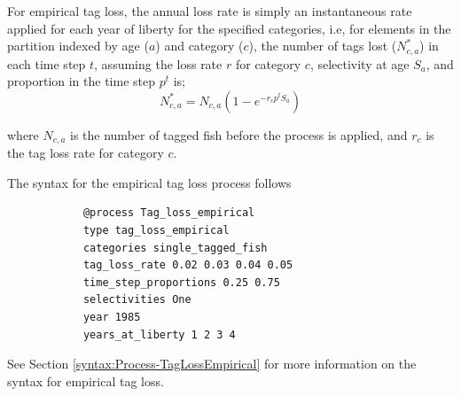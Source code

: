 For empirical tag loss, the annual loss rate is simply an instantaneous rate applied for each year of liberty for the specified categories, i.e, for elements in the partition indexed by age ($a$) and category ($c$), the number of tags lost ($N^*_{c,a}$) in each time step $t$, assuming the loss rate $r$ for category $c$, selectivity at age $S_a$, and proportion in the time step $p^t$ is; 
\begin{equation}
	N^*_{c,a} = N_{c,a} (1 -e^{-r_c p^t S_a})
\end{equation}

where $N_{c,a}$ is the number of tagged fish before the process is applied, and $r_c$ is the tag loss rate for category $c$.

The syntax for the empirical tag loss process follows

{\small{\begin{verbatim}
			@process Tag_loss_empirical
			type tag_loss_empirical
			categories single_tagged_fish
			tag_loss_rate 0.02 0.03 0.04 0.05
			time_step_proportions 0.25 0.75
			selectivities One
			year 1985
			years_at_liberty 1 2 3 4
\end{verbatim}}}

See Section \ref{syntax:Process-TagLossEmpirical} for more information on the syntax for empirical tag loss.

